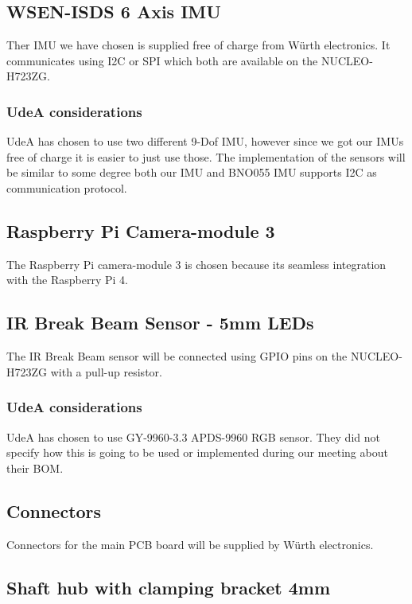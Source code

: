 \documentclass[a4paper,8pt]{article}
\begin{document}
  \subsection{WSEN-ISDS 6 Axis IMU}

  Ther IMU we have chosen is supplied free of charge from Würth
  electronics. It communicates using I2C or SPI which both are available
  on the NUCLEO-H723ZG.

  \subsubsection{UdeA considerations}

  UdeA has chosen to use two different 9-Dof IMU, however since we got our IMUs free of charge it is easier to just use those. The implementation of the sensors will be similar to some degree both our IMU and BNO055 IMU supports I2C as communication protocol.

  \subsection{Raspberry Pi Camera-module 3}

  The Raspberry Pi camera-module 3 is chosen because its seamless
  integration with the Raspberry Pi 4.

  \subsection{IR Break Beam Sensor - 5mm LEDs}

  The IR Break Beam sensor will be connected using GPIO pins on the
  NUCLEO-H723ZG with a pull-up resistor.

  \subsubsection{UdeA considerations}

  UdeA has chosen to use GY-9960-3.3 APDS-9960 RGB sensor. They did not specify how this is going to be used or implemented during our meeting about their BOM. 

  \subsection{Connectors}

  Connectors for the main PCB board will be supplied by Würth
  electronics.

  \subsection{Shaft hub with clamping bracket 4mm}
\end{document}
